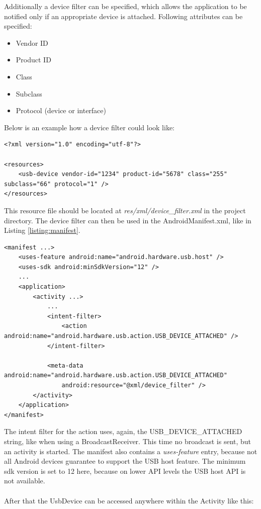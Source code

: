 Additionally a device filter can be specified, which allows the application to be notified only if an appropriate device is attached. Following attributes can be specified\cite{android_usb_host}:

\begin{itemize}
\item Vendor ID
\item Product ID
\item Class
\item Subclass
\item Protocol (device or interface)
\end{itemize}

Below is an example how a device filter could look like:

\lstset{language=XML}
\begin{lstlisting}[caption=Example device filter \cite{android_usb_host}, label=listing:device_filter]
<?xml version="1.0" encoding="utf-8"?>

<resources>
    <usb-device vendor-id="1234" product-id="5678" class="255" subclass="66" protocol="1" />
</resources>
\end{lstlisting}

This resource file should be located at \textit{res/xml/device\_filter.xml} in the project directory\cite{android_usb_host}. The device filter can then be used in the AndroidManifest.xml, like in Listing \ref{listing:manifest}.

\begin{lstlisting}[caption=AndroidManifest.xml \cite{android_usb_host}, label=listing:manifest]
<manifest ...>
    <uses-feature android:name="android.hardware.usb.host" />
    <uses-sdk android:minSdkVersion="12" />
    ...
    <application>
        <activity ...>
            ...
            <intent-filter>
                <action android:name="android.hardware.usb.action.USB_DEVICE_ATTACHED" />
            </intent-filter>

            <meta-data android:name="android.hardware.usb.action.USB_DEVICE_ATTACHED"
                android:resource="@xml/device_filter" />
        </activity>
    </application>
</manifest>
\end{lstlisting}

The intent filter for the action uses, again, the USB\_DEVICE\_ATTACHED string, like when using a BroadcastReceiver. This time no broadcast is sent, but an activity is started. The manifest also contains a \textit{uses-feature} entry, because not all Android devices guarantee to support the USB host feature\cite{android_usb_host}. The minimum sdk version is set to 12 here, because on lower API levels the USB host API is not available. \\\\
After that the UsbDevice can be accessed anywhere within the Activity like this:

